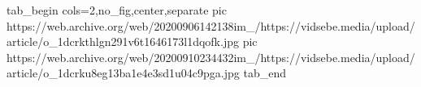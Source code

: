  
 
 
 
 


\ifcmt
  tab_begin cols=2,no_fig,center,separate
     pic https://web.archive.org/web/20200906142138im_/https://vidsebe.media/upload/article/o_1dcrkthlgn291v6t1646173l1dqofk.jpg
     pic https://web.archive.org/web/20200910234432im_/https://vidsebe.media/upload/article/o_1dcrku8eg13ba1e4e3sd1u04c9pga.jpg
  tab_end
\fi
